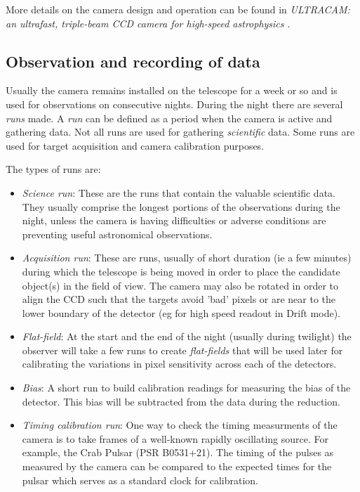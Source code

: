 \documentclass[a4paper,10pt]{article}
\begin{document}
More details on the camera design and operation can be found in \emph{ULTRACAM: an ultrafast, triple-beam CCD camera for high-speed
astrophysics \cite{dhillon07}}.

\subsection{Observation and recording of data}

Usually the camera remains installed on the telescope for a week or so and is used for observations on consecutive nights. During the night there are several \emph{runs} made. A \emph{run} can be defined as a period when the camera is active and gathering data. Not all runs are used for gathering \emph{scientific} data. Some runs are used for target acquisition and camera calibration purposes. 

The types of runs are: 
\begin{itemize}
	\item \emph{Science run}: These are the runs that contain the valuable scientific data. They usually comprise the longest portions of the observations during the night, unless the camera is having difficulties or adverse conditions are preventing useful astronomical observations.
	\item \emph{Acquisition run}: These are runs, usually of short duration (ie a few minutes) during which the telescope is being moved in order to place the candidate object(s) in the field of view. The camera may also be rotated in order to align the CCD such that the targets avoid 'bad' pixels or are near to the lower boundary of the detector (eg for high speed readout in Drift mode). 
	\item \emph{Flat-field}: At the start and the end of the night (usually during twilight) the observer will take a few runs to create \emph{flat-fields} that will be used later for calibrating the variations in pixel sensitivity across each of the detectors.  
	\item \emph{Bias}: A short run to build calibration readings for measuring the bias of the detector. This bias will be subtracted from the data during the reduction. 
	\item \emph{Timing calibration run}: One way to check the timing measurments of the camera is to take frames of a well-known rapidly oscillating source. For example, the Crab Pulsar (PSR B0531+21). The timing of the pulses as measured by the camera can be compared to the expected times for the pulsar which serves as a standard clock for calibration.
\end{itemize}
\end{document}
